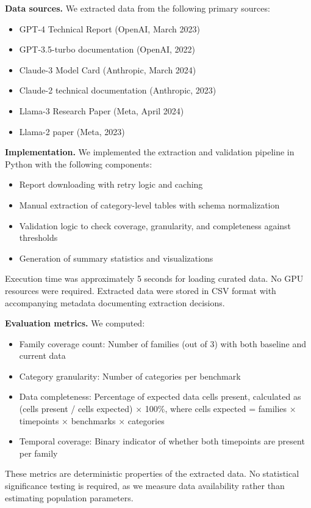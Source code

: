 
\textbf{Data sources.} We extracted data from the following primary sources:
\begin{itemize}
\item GPT-4 Technical Report (OpenAI, March 2023)
\item GPT-3.5-turbo documentation (OpenAI, 2022)
\item Claude-3 Model Card (Anthropic, March 2024)
\item Claude-2 technical documentation (Anthropic, 2023)
\item Llama-3 Research Paper (Meta, April 2024)
\item Llama-2 paper (Meta, 2023)
\end{itemize}

\textbf{Implementation.} We implemented the extraction and validation pipeline in Python with the following components:
\begin{itemize}
\item Report downloading with retry logic and caching
\item Manual extraction of category-level tables with schema normalization
\item Validation logic to check coverage, granularity, and completeness against thresholds
\item Generation of summary statistics and visualizations
\end{itemize}

Execution time was approximately 5 seconds for loading curated data. No GPU resources were required. Extracted data were stored in CSV format with accompanying metadata documenting extraction decisions.

\textbf{Evaluation metrics.} We computed:
\begin{itemize}
\item Family coverage count: Number of families (out of 3) with both baseline and current data
\item Category granularity: Number of categories per benchmark
\item Data completeness: Percentage of expected data cells present, calculated as (cells present / cells expected) × 100\%, where cells expected = families × timepoints × benchmarks × categories
\item Temporal coverage: Binary indicator of whether both timepoints are present per family
\end{itemize}

These metrics are deterministic properties of the extracted data. No statistical significance testing is required, as we measure data availability rather than estimating population parameters.
